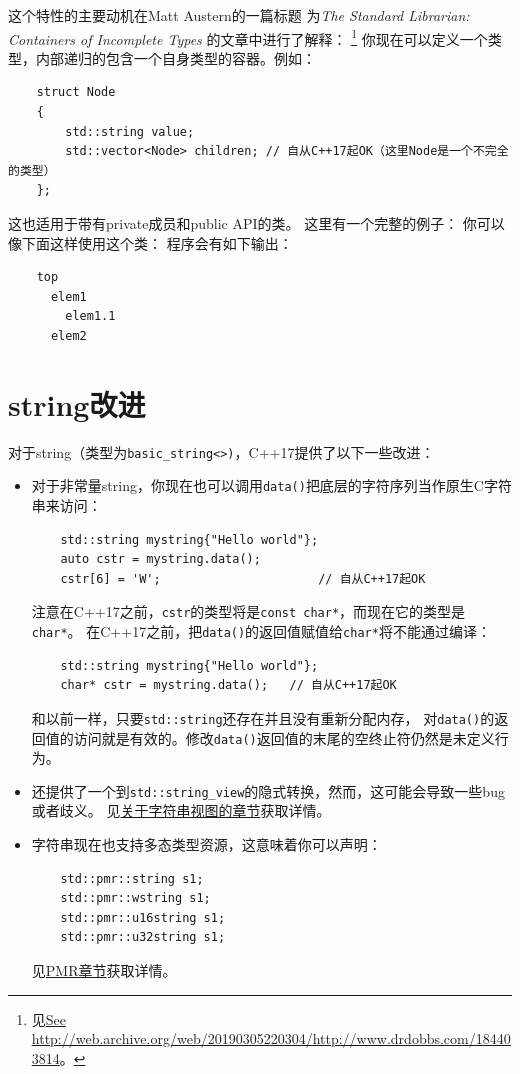 这个特性的主要动机在Matt Austern的一篇标题
为\emph{The Standard Librarian: Containers of Incomplete Types}
的文章中进行了解释：
\footnote{见\url{See http://web.archive.org/web/20190305220304/http://www.drdobbs.com/184403814}。}
你现在可以定义一个类型，内部递归的包含一个自身类型的容器。例如：
\begin{lstlisting}
    struct Node
    {
        std::string value;
        std::vector<Node> children; // 自从C++17起OK（这里Node是一个不完全的类型）
    };
\end{lstlisting}
这也适用于带有private成员和public API的类。
这里有一个完整的例子：
你可以像下面这样使用这个类：
程序会有如下输出：
\begin{lstlisting}
    top
      elem1
        elem1.1
      elem2
\end{lstlisting}


\section{string改进}
对于string（类型为\texttt{basic\_string<>)}，C++17提供了以下一些改进：
\begin{itemize}
    \item 对于非常量string，你现在也可以调用\texttt{data()}把底层的字符序列当作原生C字符串来访问：
    \begin{lstlisting}
    std::string mystring{"Hello world"};
    auto cstr = mystring.data();
    cstr[6] = 'W';                      // 自从C++17起OK
    \end{lstlisting}
    注意在C++17之前，\texttt{cstr}的类型将是\texttt{const char*}，而现在它的类型是\texttt{char*}。
    在C++17之前，把\texttt{data()}的返回值赋值给\texttt{char*}将不能通过编译：
    \begin{lstlisting}
    std::string mystring{"Hello world"};
    char* cstr = mystring.data();   // 自从C++17起OK
    \end{lstlisting}
    和以前一样，只要\texttt{std::string}还存在并且没有重新分配内存，
    对\texttt{data()}的返回值的访问就是有效的。修改\texttt{data()}返回值的末尾的空终止符仍然是未定义行为。
    \item 还提供了一个到\texttt{std::string\_view}的隐式转换，然而，这可能会导致一些bug或者歧义。
    见\hyperref[ch19]{关于字符串视图的章节}获取详情。
    \item 字符串现在也支持多态类型资源，这意味着你可以声明：
    \begin{lstlisting}
    std::pmr::string s1;
    std::pmr::wstring s1;
    std::pmr::u16string s1;
    std::pmr::u32string s1;
    \end{lstlisting}
    见\hyperref[ch29]{PMR章节}获取详情。
\end{itemize}


